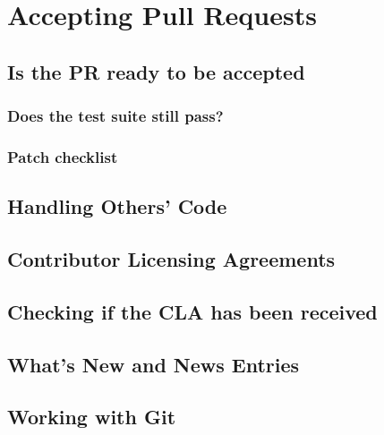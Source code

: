 \documentclass[]{book}
\begin{document}
\hypertarget{accepting-pull-requests}{%
\chapter{Accepting Pull Requests}\label{accepting-pull-requests}}

\hypertarget{is-the-pr-ready-to-be-accepted}{%
\section{Is the PR ready to be accepted}\label{is-the-pr-ready-to-be-accepted}}

\hypertarget{does-the-test-suite-still-pass}{%
\subsection{Does the test suite still pass?}\label{does-the-test-suite-still-pass}}

\hypertarget{patch-checklist}{%
\subsection{Patch checklist}\label{patch-checklist}}

\hypertarget{handling-others-code}{%
\section{Handling Others' Code}\label{handling-others-code}}

\hypertarget{contributor-licensing-agreements}{%
\section{Contributor Licensing Agreements}\label{contributor-licensing-agreements}}

\hypertarget{checking-if-the-cla-has-been-received}{%
\section{Checking if the CLA has been received}\label{checking-if-the-cla-has-been-received}}

\hypertarget{whats-new-and-news-entries}{%
\section{What's New and News Entries}\label{whats-new-and-news-entries}}

\hypertarget{working-with-git}{%
\section{Working with Git}\label{working-with-git}}
\end{document}
